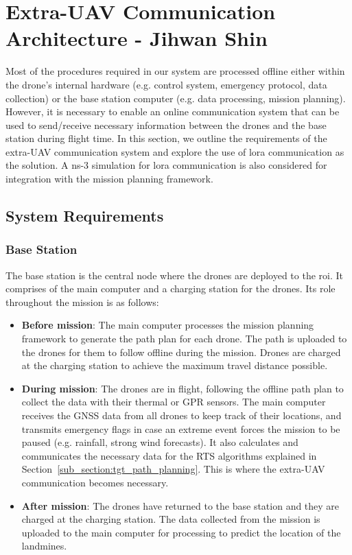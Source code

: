 \newpage
{}
\section{Extra-UAV Communication Architecture - Jihwan Shin} \label{sec:euc}

Most of the procedures required in our system are processed offline either within the drone's internal hardware (e.g. control system, emergency protocol, data collection) or the base station computer (e.g. data processing, mission planning). However, it is necessary to enable an online communication system that can be used to send/receive necessary information between the drones and the base station during flight time. In this section, we outline the requirements of the extra-\gls{UAV} communication system and explore the use of \gls{lora} communication as the solution. A ns-3 simulation for \gls{lora} communication is also considered for integration with the mission planning framework. 

\subsection{System Requirements}
\label{sec:euc_requirements}

\subsubsection{Base Station}

The base station is the central node where the drones are deployed to the \gls{roi}. It comprises of the main computer and a charging station for the drones. Its role throughout the mission is as follows:

\begin{itemize}
    \item \textbf{Before mission}: The main computer processes the mission planning framework to generate the path plan for each drone. The path is uploaded to the drones for them to follow offline during the mission. Drones are charged at the charging station to achieve the maximum travel distance possible. 
    \item \textbf{During mission}: The drones are in flight, following the offline path plan to collect the data with their thermal or \gls{GPR} sensors. The main computer receives the \gls{GNSS} data from all drones to keep track of their locations, and transmits emergency flags in case an extreme event forces the mission to be paused (e.g. rainfall, strong wind forecasts). It also calculates and communicates the necessary data for the \gls{RTS} algorithms explained in Section~\ref{sub_section:tgt_path_planning}. This is where the extra-\gls{UAV} communication becomes necessary. 
    \item \textbf{After mission}: The drones have returned to the base station and they are charged at the charging station. The data collected from the mission is uploaded to the main computer for processing to predict the location of the landmines. 
\end{itemize}

